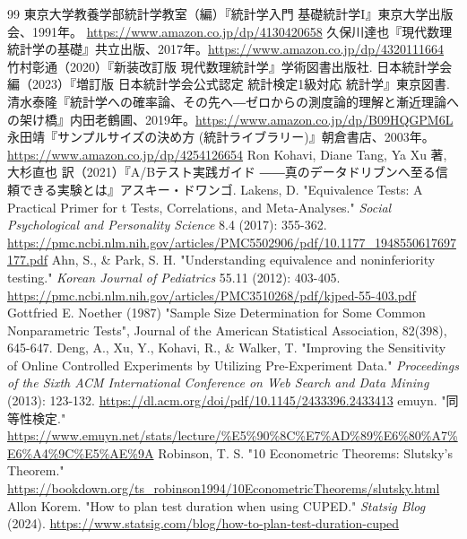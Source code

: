 \documentclass[12pt]{jarticle}
\numberwithin{equation}{section}    %
\numberwithin{figure}{section}      %
\numberwithin{table}{section}      %
\theoremstyle{definition}
\begin{document}
\tableofcontents
\newpage

















\renewcommand{\refname}{参考文献}

\begin{thebibliography}{99}
     東京大学教養学部統計学教室（編）『統計学入門 基礎統計学I』東京大学出版会、1991年。 \url{https://www.amazon.co.jp/dp/4130420658}
     久保川達也『現代数理統計学の基礎』共立出版、2017年。\url{https://www.amazon.co.jp/dp/4320111664}
     竹村彰通（2020）『新装改訂版 現代数理統計学』学術図書出版社.
     日本統計学会 編（2023）『増訂版 日本統計学会公式認定 統計検定1級対応 統計学』東京図書.
     清水泰隆『統計学への確率論、その先へ―ゼロからの測度論的理解と漸近理論への架け橋』内田老鶴圃、2019年。\url{https://www.amazon.co.jp/dp/B09HQGPM6L}
     永田靖『サンプルサイズの決め方 (統計ライブラリー)』朝倉書店、2003年。\url{https://www.amazon.co.jp/dp/4254126654}
     Ron Kohavi, Diane Tang, Ya Xu 著, 大杉直也 訳（2021）『A/Bテスト実践ガイド ――真のデータドリブンへ至る信頼できる実験とは』アスキー・ドワンゴ.
     Lakens, D. "Equivalence Tests: A Practical Primer for t Tests, Correlations, and Meta-Analyses." \textit{Social Psychological and Personality Science} 8.4 (2017): 355-362. \url{https://pmc.ncbi.nlm.nih.gov/articles/PMC5502906/pdf/10.1177_1948550617697177.pdf}
     Ahn, S., \& Park, S. H. "Understanding equivalence and noninferiority testing." \textit{Korean Journal of Pediatrics} 55.11 (2012): 403-405. \url{https://pmc.ncbi.nlm.nih.gov/articles/PMC3510268/pdf/kjped-55-403.pdf}
     Gottfried E. Noether (1987) "Sample Size Determination for Some Common Nonparametric Tests", Journal of the American Statistical Association, 82(398), 645-647.
     Deng, A., Xu, Y., Kohavi, R., \& Walker, T. "Improving the Sensitivity of Online Controlled Experiments by Utilizing Pre-Experiment Data." \textit{Proceedings of the Sixth ACM International Conference on Web Search and Data Mining} (2013): 123-132. \url{https://dl.acm.org/doi/pdf/10.1145/2433396.2433413}
     emuyn. "同等性検定." \url{https://www.emuyn.net/stats/lecture/%E5%90%8C%E7%AD%89%E6%80%A7%E6%A4%9C%E5%AE%9A}
     Robinson, T. S. "10 Econometric Theorems: Slutsky's Theorem." \url{https://bookdown.org/ts_robinson1994/10EconometricTheorems/slutsky.html}
     Allon Korem. "How to plan test duration when using CUPED." \textit{Statsig Blog} (2024). \url{https://www.statsig.com/blog/how-to-plan-test-duration-cuped}
\end{thebibliography}
\end{document}
